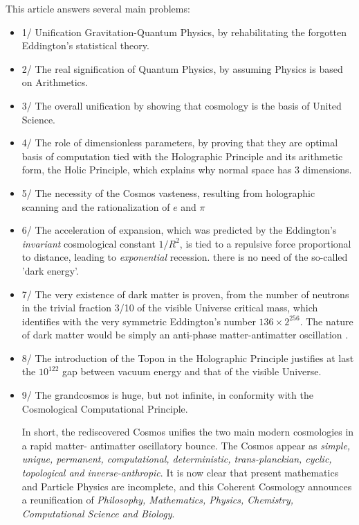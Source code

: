\documentclass[twoside,draft]{article}
\begin{document}
\begin{sloppypar}
This article answers several main problems: 
\begin{itemize}
\item 1/ Unification Gravitation-Quantum Physics, by
rehabilitating the forgotten Eddington's statistical theory. 
\item 2/ The real signification of Quantum
Physics, by assuming Physics is based on Arithmetics. 
\item 3/ The overall unification by showing that
cosmology is the basis of United Science. 
\item 4/ The role of dimensionless parameters, by proving that
they are optimal basis of computation tied with the Holographic Principle and its arithmetic form,
the Holic Principle, which explains why normal space has 3 dimensions.
\item 5/ The necessity of the Cosmos vasteness, resulting from holographic scanning and the rationalization of $e$ and $\pi$
\item 6/ The acceleration of expansion, which was predicted by the Eddington's \textit{invariant} cosmological constant $1/R^2$, is tied to a repulsive force proportional to distance, leading to \textit{exponential} recession. there is no need of the so-called 'dark energy'.
\item 7/ The very existence of dark matter is proven, from the number of neutrons in the trivial fraction 3/10 of the visible Universe critical mass, which identifies with the very symmetric Eddington's number $136 \times 2^{256}$. The nature of dark matter would be simply an anti-phase matter-antimatter oscillation \cite{Sanchez1}.  
\item 8/ The introduction of the Topon in the Holographic Principle justifies at last the $10^{122}$ gap between vacuum energy and that of the visible Universe.
\item 9/ The grandcosmos is huge, but not infinite, in conformity with the Cosmological Computational Principle.

In short, the rediscovered Cosmos unifies the two main modern cosmologies in a rapid matter-
antimatter oscillatory bounce. The Cosmos appear as \textit{simple, unique, permanent, computational,
deterministic, trans-planckian, cyclic, topological and inverse-anthropic}. It is now clear that present mathematics and Particle Physics are incomplete, and this Coherent Cosmology announces a reunification of \textit{Philosophy, Mathematics, Physics, Chemistry, Computational Science and Biology}.


\end{itemize}
\end{sloppypar}
\end{document}
